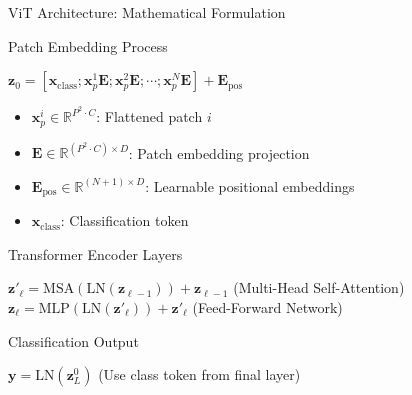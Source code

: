 \documentclass[aspectratio=169]{beamer}
\begin{document}
\begin{frame}{ViT Architecture: Mathematical Formulation}
    \begin{block}{Patch Embedding Process}
        \begin{center}
            \Large
            $\mathbf{z}_0 = [\mathbf{x}_{\text{class}}; \mathbf{x}_p^1\mathbf{E}; \mathbf{x}_p^2\mathbf{E}; \cdots; \mathbf{x}_p^N\mathbf{E}] + \mathbf{E}_{\text{pos}}$
        \end{center}
        \begin{itemize}
            \item $\mathbf{x}_p^i \in \mathbb{R}^{P^2 \cdot C}$: Flattened patch $i$
            \item $\mathbf{E} \in \mathbb{R}^{(P^2 \cdot C) \times D}$: Patch embedding projection
            \item $\mathbf{E}_{\text{pos}} \in \mathbb{R}^{(N+1) \times D}$: Learnable positional embeddings
            \item $\mathbf{x}_{\text{class}}$: Classification token
        \end{itemize}
    \end{block}
    
    \begin{block}{Transformer Encoder Layers}
        \begin{center}
            $\mathbf{z}'_\ell = \text{MSA}(\text{LN}(\mathbf{z}_{\ell-1})) + \mathbf{z}_{\ell-1}$ \hspace{2em} (Multi-Head Self-Attention)\\
            \vspace{0.5em}
            $\mathbf{z}_\ell = \text{MLP}(\text{LN}(\mathbf{z}'_\ell)) + \mathbf{z}'_\ell$ \hspace{2em} (Feed-Forward Network)
        \end{center}
    \end{block}
    
    \begin{block}{Classification Output}
        \begin{center}
            $\mathbf{y} = \text{LN}(\mathbf{z}_L^0)$ \hspace{2em} (Use class token from final layer)
        \end{center}
    \end{block}
\end{frame}
\end{document}
